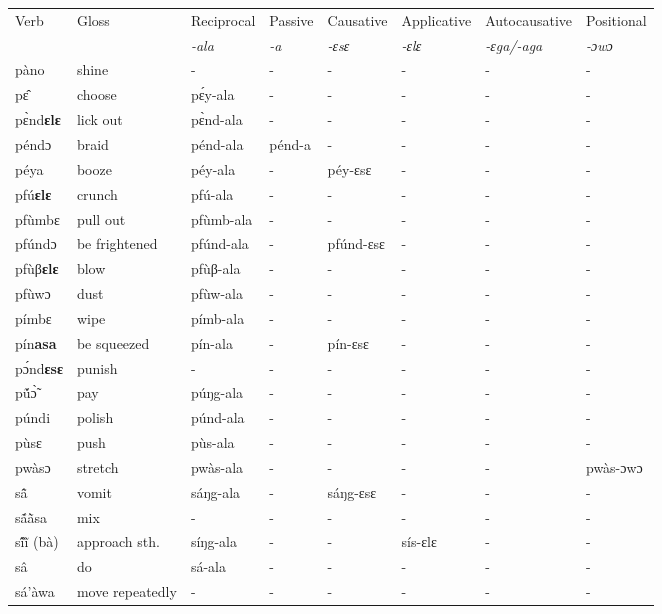 \begin{sidewaystable}
\begin{tabular}{llllllll}
 \lsptoprule
 Verb & Gloss & Reciprocal & Passive  & Causative  & Applicative   & Autocausative & Positional   \\
  &    & {\itshape -ala} & {\itshape -a} & {\itshape -ɛsɛ} & {\itshape -ɛlɛ} & {\itshape -ɛga/-aga}  & {\itshape -ɔwɔ}  \\
\midrule
pàno & shine & - & - & - & - & - & - \\
pɛ̂ & choose & pɛ́y-ala & - & - & - & - & - \\
pɛ̀nd{\bfseries ɛlɛ} & lick out  & pɛ̀nd-ala & - & - & - & - & - \\
péndɔ & braid & pénd-ala & pénd-a & - & - & - & - \\
péya & booze & péy-ala & - & péy-ɛsɛ & - &  - & - \\
pfú{\bfseries ɛlɛ} & crunch & pfú-ala & - & - & - & - &  - \\
pfùmbɛ & pull out & pfùmb-ala & - &  - & - & - & -  \\
pfúndɔ & be frightened & pfúnd-ala & - & pfúnd-ɛsɛ & - &  - & - \\
pfùβ{\bfseries ɛlɛ} & blow & pfùβ-ala & - & - & - & - &  - \\
pfùwɔ & dust & pfùw-ala & - & - & -  & - & - \\
pímbɛ & wipe & pímb-ala & - & - & - & - & - \\
pín{\bfseries asa} & be squeezed & pín-ala & - & pín-ɛsɛ & - &  - & - \\
pɔ́nd{\bfseries ɛsɛ} & punish & - & - & - & - & - & - \\
pṹɔ̃̀ & pay & púŋg-ala & - & - & - & - & - \\
púndi & polish & púnd-ala & - & - & - & - & - \\
pùsɛ & push & pùs-ala & - & - & - & - & - \\
pwàsɔ & stretch & pwàs-ala  & - & - & - & - &  pwàs-ɔwɔ \\
sã̂ & vomit &  sáŋg-ala & - & sáŋg-ɛsɛ & - &  - & - \\
sã́ã̀sa & mix & - & - & - & - & - & - \\
sĩ́ĩ̀ (bà) & approach sth. & síŋg-ala & - & - & sís-ɛlɛ & - & - \\
sâ & do & sá-ala & - & - & -  & - & - \\
sá'àwa & move repeatedly & - & - & - & - & - & - \\
\midrule\end{tabular}\end{sidewaystable}

